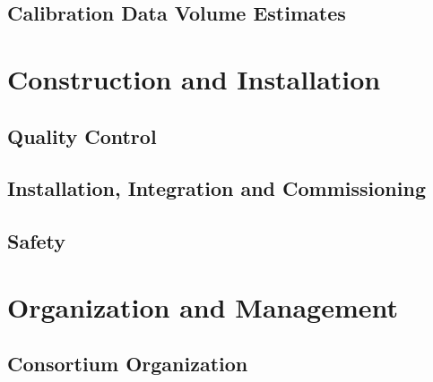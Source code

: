 \subsection{Calibration Data Volume Estimates}
\label{sec:sp-calib-daqreq}


%


\section{Construction and Installation}
\label{sec:sp-calib-const}

\subsection{Quality Control}
\label{sec:sp-calib-qc}


\subsection{Installation, Integration and Commissioning}
\label{sec:sp-calib-iic}


\subsection{Safety}
\label{sec:sp-calib-safe}




\section{Organization and Management}
\label{sec:sp-calib-org-manag}
\subsection{Consortium Organization}
\label{sec:sp-calib-org}


